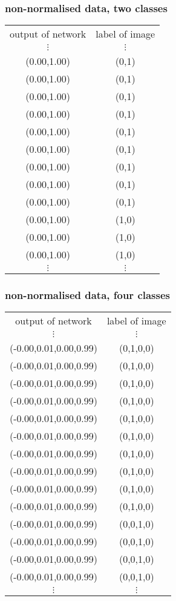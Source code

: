 \subsubsection{ non-normalised data, two classes}

\begin{tabular}{cc}
output of network & label of image \\
$\vdots$ & $\vdots$ \\
(0.00,1.00) & (0,1)  \\
(0.00,1.00) & (0,1)  \\
(0.00,1.00) & (0,1)  \\
(0.00,1.00) & (0,1)  \\
(0.00,1.00) & (0,1)  \\
(0.00,1.00) & (0,1)  \\
(0.00,1.00) & (0,1)  \\
(0.00,1.00) & (0,1)  \\
(0.00,1.00) & (0,1)  \\
(0.00,1.00) & (1,0)  \\
(0.00,1.00) & (1,0)  \\
(0.00,1.00) & (1,0)  \\
$\vdots$ & $\vdots$ 
\end{tabular}

\subsubsection{ non-normalised data, four classes}

\begin{tabular}{cc}
output of network & label of image \\
$\vdots$ & $\vdots$ \\
(-0.00,0.01,0.00,0.99) & (0,1,0,0)  \\
(-0.00,0.01,0.00,0.99) & (0,1,0,0)  \\
(-0.00,0.01,0.00,0.99) & (0,1,0,0)  \\
(-0.00,0.01,0.00,0.99) & (0,1,0,0)  \\
(-0.00,0.01,0.00,0.99) & (0,1,0,0)  \\
(-0.00,0.01,0.00,0.99) & (0,1,0,0)  \\
(-0.00,0.01,0.00,0.99) & (0,1,0,0)  \\
(-0.00,0.01,0.00,0.99) & (0,1,0,0)  \\
(-0.00,0.01,0.00,0.99) & (0,1,0,0)  \\
(-0.00,0.01,0.00,0.99) & (0,1,0,0)  \\
(-0.00,0.01,0.00,0.99) & (0,0,1,0)  \\
(-0.00,0.01,0.00,0.99) & (0,0,1,0)  \\
(-0.00,0.01,0.00,0.99) & (0,0,1,0)  \\
(-0.00,0.01,0.00,0.99) & (0,0,1,0)  \\
$\vdots$ & $\vdots$ 
\end{tabular}

